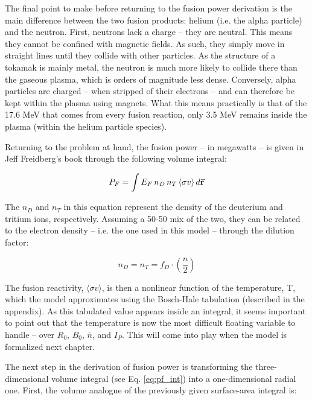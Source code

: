 The final point to make before returning to the fusion power derivation is the main difference between the two fusion products: helium (i.e. the alpha particle) and the neutron. First, neutrons lack a charge -- they are neutral. This means they cannot be confined with magnetic fields. As such, they simply move in straight lines until they collide with other particles. As the structure of a tokamak is mainly metal, the neutron is much more likely to collide there than the gaseous plasma, which is orders of magnitude less dense. Conversely, alpha particles are charged -- when stripped of their electrons -- and can therefore be kept within the plasma using magnets. What this means practically is that of the 17.6 MeV that comes from every fusion reaction, only 3.5 MeV remains inside the plasma (within the helium particle species).
 
 Returning to the problem at hand, the fusion power -- in megawatts -- is given in Jeff Freidberg's book through the following volume integral:
 
 \begin{equation}
 	\label{eq:pf_int}
 	P_F = \int E_F \, n_D \, n_T \, \langle \sigma v \rangle \, d \vec{\bold{r}}
 \end{equation}
 
 The $n_D$ and $n_T$ in this equation represent the density of the deuterium and tritium ions, respectively. Assuming a 50-50 mix of the two, they can be related to the electron density -- i.e. the one used in this model -- through the dilution factor:
 
 \begin{equation}
 	n_D = n_T = f_D \cdot \left( \frac{n}{2} \right)
 \end{equation}
 
 The fusion reactivity, $\langle \sigma v \rangle$, is then a nonlinear function of the temperature, T, which the model approximates using the Bosch-Hale tabulation (described in the appendix). As this tabulated value appears inside an integral, it seems important to point out that the temperature is now the most difficult floating variable to handle -- over $R_0$, $B_0$, $\overline n$, and $I_P$. This will come into play when the model is formalized next chapter.
 
 The next step in the derivation of fusion power is transforming the three-dimensional volume integral (see Eq. \ref{eq:pf_int}) into a one-dimensional radial one. First, the volume analogue of the previously given surface-area integral is:
 

